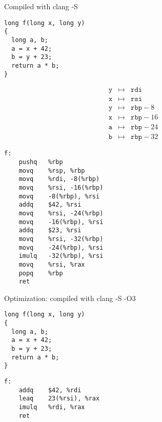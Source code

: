 \documentclass[landscape]{beamer}
\begin{document}
\begin{frame}[fragile]{Compiled with clang -S}
\begin{minipage}{.55\textwidth}
\begin{verbatim}
long f(long x, long y)
{
  long a, b;
  a = x + 42;
  b = y + 23;
  return a * b;
}
\end{verbatim}

\begin{eqnarray*}
\texttt y&\mapsto& \texttt{rdi}
\\
\texttt x&\mapsto& \texttt{rsi}
\\
\texttt y&\mapsto& \texttt{rbp}-8
\\
\texttt x&\mapsto& \texttt{rbp}-16 
\\
\texttt a&\mapsto& \texttt{rbp}-24
\\
\texttt b&\mapsto& \texttt{rbp}-32
\end{eqnarray*}

\end{minipage}
%
\begin{minipage}{.4\textwidth}
\begin{verbatim}
f:
	pushq	%rbp
	movq	%rsp, %rbp
	movq	%rdi, -8(%rbp)
	movq	%rsi, -16(%rbp)
	movq	-8(%rbp), %rsi
	addq	$42, %rsi
	movq	%rsi, -24(%rbp)
	movq	-16(%rbp), %rsi
	addq	$23, %rsi
	movq	%rsi, -32(%rbp)
	movq	-24(%rbp), %rsi
	imulq	-32(%rbp), %rsi
	movq	%rsi, %rax
	popq	%rbp
	ret
\end{verbatim}
\end{minipage}
\end{frame}



\begin{frame}[fragile]{Optimization: compiled with clang -S -O3}
\begin{minipage}{.5\textwidth}
\begin{verbatim}
long f(long x, long y)
{
  long a, b;
  a = x + 42;
  b = y + 23;
  return a * b;
}
\end{verbatim}
\end{minipage}
%
\begin{minipage}{.4\textwidth}
\begin{verbatim}
f:                                      
	addq	$42, %rdi
	leaq	23(%rsi), %rax
	imulq	%rdi, %rax
	ret
\end{verbatim}
\end{minipage}
\end{frame}
\end{document}
